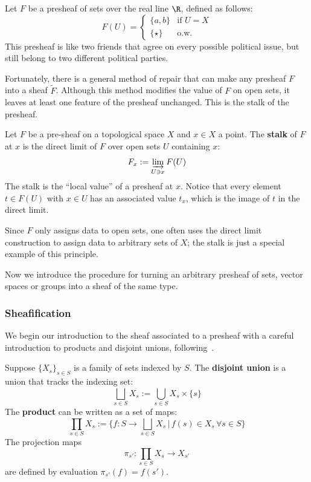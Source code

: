 \begin{ex}[Inconsistent]\label{ex:inconsistentpresheaf}
Let $F$ be a presheaf of sets over the real line $\R$, defined as follows:
\begin{equation*}
 F(U)=
\begin{cases}
 \{a,b\} & \text{if } U=X \\
\{\star\} & \text{o.w.}
\end{cases}
\end{equation*}
This presheaf is like two friends that agree on every possible political issue, but still belong to two different political parties.
\end{ex}

Fortunately, there is a general method of repair that can make any presheaf $F$ into a sheaf $\widetilde{F}$. Although this method modifies the value of $F$ on open sets, it leaves at least one feature of the presheaf unchanged. This is the stalk of the presheaf.

\begin{defn}
Let $F$ be a pre-sheaf on a topological space $X$ and $x\in X$ a point. The \textbf{stalk} of $F$ at $x$ is the direct limit of $F$ over open sets $U$ containing $x$:
\[
F_x:=\varinjlim_{U\ni x} F(U)
\]
The stalk is the ``local value'' of a presheaf at $x$. Notice that every element $t\in F(U)$ with $x\in U$ has an associated value $t_x$, which is the image of $t$ in the direct limit.
\end{defn}
\begin{rmk}
 Since $F$ only assigns data to open sets, one often uses the direct limit construction to assign data to arbitrary sets of $X$; the stalk is just a special example of this principle.
 \end{rmk}

Now we introduce the procedure for turning an arbitrary presheaf of sets, vector spaces or groups into a sheaf of the same type.

\subsubsection{Sheafification}

We begin our introduction to the sheaf associated to a presheaf with a careful introduction to products and disjoint unions, following~\cite{deville2012dynamics}.

\begin{defn}
Suppose $\{X_s\}_{s\in S}$ is a family of sets indexed by $S$. The \textbf{disjoint union} is a union that tracks the indexing set:
\[
\bigsqcup_{s\in S} X_s := \bigcup_{s\in S} X_s\times \{s\}
\]
The \textbf{product} can be written as a set of maps:
\[
\prod_{s\in S} X_s := \{ f: S \to \bigsqcup_{s\in S} X_s \,|\, f(s)\in X_s\, \forall s\in S\}
\]
The projection maps 
\[
\pi_{s'}:\prod_{s\in S} X_s \to X_{s'}
\]
are defined by evaluation $\pi_{s'}(f)=f(s')$.
\end{defn}

